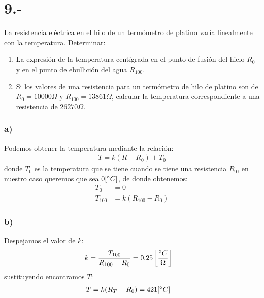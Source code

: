 \documentclass{article}
\begin{document}
\begin{tcolorbox}[breakable]

\end{tcolorbox}
\section*{9.-} 
La resistencia eléctrica en el hilo de un termómetro de platino varía linealmente con
la temperatura. Determinar:
\begin{enumerate}
    \item La expresión de la temperatura centígrada en el punto de fusión del hielo 
    $R_0$ y en el punto de ebullición del agua $R_{100}$. 
    
    \item Si los valores de una resistencia para un termómetro de hilo de platino son de 
    $R_0 = 10000 \Omega$ y $R_{100} = 13861 \Omega$, calcular la temperatura correspondiente 
    a una resistencia de $26270 \Omega$. 
\end{enumerate}

\begin{tcolorbox}[breakable]
    \subsubsection*{a)}
    Podemos obtener la temperatura mediante la relación:
    \begin{align*}
        T = k(R-R_0) + T_0
    \end{align*}
    donde $T_0$ es la temperatura que se tiene cuando se tiene una resistencia $R_0$,
    en nuestro caso queremos que sea $0 [\degree C]$, de donde obtenemos:
    \begin{align*}
        T_0 &= 0  \\
        T_{100} &= k(R_{100}-R_0) 
    \end{align*}
    \subsubsection*{b)}
    Despejamos el valor de $k$:
    \begin{align*}
        k &= \frac{T_{100}}{R_{100}-R_0} = 0.25 \left[ \frac{\degree C}{\Omega} \right]
    \end{align*}
    sustituyendo encontramos $T$:
    \begin{align*}
        T &= k(R_{T} - R_{0}) = 421 [\degree C] 
    \end{align*}

\end{tcolorbox}
\end{document}
